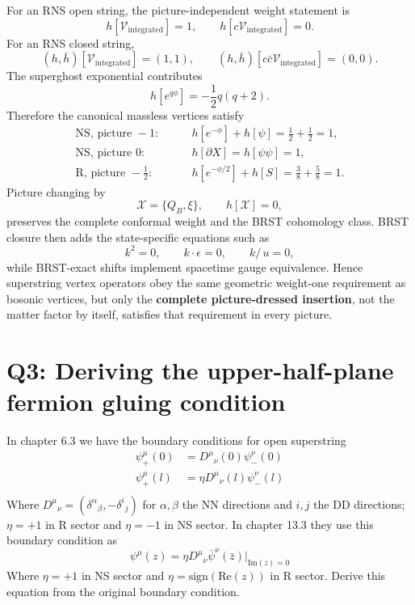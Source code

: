 \documentclass[
  10pt,
  a4paper,
  openany]{book}
\begin{document}
For an RNS open string, the picture-independent weight statement is \[
\boxed{
h[\mathcal V_{\mathrm{integrated}}]=1,
\qquad
h[c\mathcal V_{\mathrm{integrated}}]=0
}.
\] For an RNS closed string, \[
\boxed{
(h,\bar h)[\mathcal V_{\mathrm{integrated}}]=(1,1),
\qquad
(h,\bar h)[c\bar c\mathcal V_{\mathrm{integrated}}]=(0,0)
}.
\] The superghost exponential contributes \[
\boxed{
h[e^{q\phi}]=-\frac12q(q+2)
}.
\] Therefore the canonical massless vertices satisfy \[
\begin{aligned}
\text{NS, picture }-1:
&\qquad
h[e^{-\phi}]+h[\psi]
=\frac12+\frac12=1,\\%
\text{NS, picture }0:
&\qquad
h[\partial X]
=h[\psi\psi]=1,\\%
\text{R, picture }-\frac12:
&\qquad
h[e^{-\phi/2}]+h[S]
=\frac38+\frac58=1.
\end{aligned}
\] Picture changing by \[
\mathcal X=\{Q_B,\xi\},
\qquad
h[\mathcal X]=0,
\] preserves the complete conformal weight and the BRST cohomology
class. BRST closure then adds the state-specific equations such as \[
k^2=0,
\qquad
k\cdot\epsilon=0,
\qquad
k\!\!\!/\,u=0,
\] while BRST-exact shifts implement spacetime gauge equivalence. Hence
superstring vertex operators obey the same geometric weight-one
requirement as bosonic vertices, but only the \textbf{complete
picture-dressed insertion}, not the matter factor by itself, satisfies
that requirement in every picture.

\section{Q3: Deriving the upper-half-plane fermion gluing
condition}\label{q3-deriving-the-upper-half-plane-fermion-gluing-condition}

In chapter 6.3 we have the boundary conditions for open superstring \[
\begin{aligned}
\psi_{+}^\mu(0)&={D^\mu}_{\nu}(0)\psi_{-}^\nu(0)\\
\psi_{+}^\mu(l)&=\eta{D^\mu}_{\nu}(l)\psi_{-}^\nu(l)\\
\end{aligned}
\] Where \({D^\mu}_{\nu}=({\delta^\alpha}_{\beta},-{\delta^i}_{j})\) for
\(\alpha,\beta\) the NN directions and \(i,j\) the DD directions;
\(\eta=+1\) in R sector and \(\eta=-1\) in NS sector. In chapter 13.3
they use this boundary condition as \[
\psi^\mu(z)=\eta{D^\mu}_{\nu}\bar{\psi}^\nu(\bar{z})|_{\mathrm{Im}(z)=0}
\] Where \(\eta=+1\) in NS sector and
\(\eta=\mathrm{sign}(\mathrm{Re}(z))\) in R sector. Derive this equation
from the original boundary condition.
\end{document}
